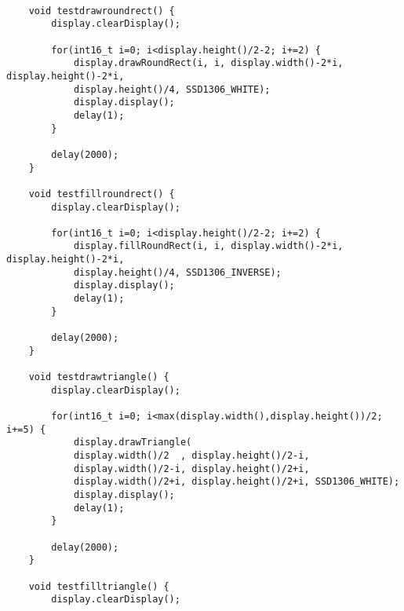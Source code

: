 \begin{code} [H]	
\begin{lstlisting} 
	
	void testdrawroundrect() {
		display.clearDisplay();
		
		for(int16_t i=0; i<display.height()/2-2; i+=2) {
			display.drawRoundRect(i, i, display.width()-2*i, display.height()-2*i,
			display.height()/4, SSD1306_WHITE);
			display.display();
			delay(1);
		}
		
		delay(2000);
	}
	
	void testfillroundrect() {
		display.clearDisplay();
		
		for(int16_t i=0; i<display.height()/2-2; i+=2) {
			display.fillRoundRect(i, i, display.width()-2*i, display.height()-2*i,
			display.height()/4, SSD1306_INVERSE);
			display.display();
			delay(1);
		}
		
		delay(2000);
	}
	
	void testdrawtriangle() {
		display.clearDisplay();
		
		for(int16_t i=0; i<max(display.width(),display.height())/2; i+=5) {
			display.drawTriangle(
			display.width()/2  , display.height()/2-i,
			display.width()/2-i, display.height()/2+i,
			display.width()/2+i, display.height()/2+i, SSD1306_WHITE);
			display.display();
			delay(1);
		}
		
		delay(2000);
	}
	
	void testfilltriangle() {
		display.clearDisplay();
		
\end{lstlisting} 
\end{code}

